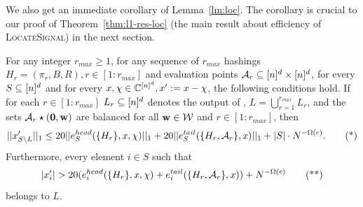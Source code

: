 We also get an immediate corollary of Lemma~\ref{lm:loc}. The corollary is crucial to our proof of Theorem~\ref{thm:l1-res-loc} (the main result about efficiency of \textsc{LocateSignal}) in the next section.
\begin{corollary}\label{cor:loc}
For any integer $r_{max}\geq 1$,  for any sequence of $r_{max}$ hashings $H_r=(\pi_r, B, R), r\in [1:r_{max}]$ and evaluation points ${\mathcal{A}}_r\subseteq {[n]^d}\times {[n]^d}$,  for every $S\subseteq {[n]^d}$ and for every $x, \chi\in \mathbb{C}^{{[n]^d}}, x':=x-\chi$, the following conditions hold.
If for each $r\in [1:r_{max}]$ $L_r\subseteq {[n]^d}$ denotes the output of , $L=\bigcup_{r=1}^{r_{max}} L_r$, and the sets ${\mathcal{A}}_r\star(\mathbf{0}, \mathbf{w})$ are balanced for all $\mathbf{w}\in \mathcal{W}$ and $r\in [1:r_{max}]$, then
\begin{equation}
||x'_{S\setminus L}||_1\leq 20 ||e^{head}_S(\{H_r\}, x, \chi)||_1+20 ||e^{tail}_S(\{H_r, {\mathcal{A}}_r\}, x)||_1+|S|\cdot N^{-\Omega(c)}.\tag{*}
\end{equation}
Furthermore, every element $i\in S$ such that 
\begin{equation}
|x'_i|>20 (e^{head}_i(\{H_r\}, x, \chi)+e^{tail}_i(\{H_r, \A_r\}, x))+N^{-\Omega(c)}\tag{**}
\end{equation}
belongs to $L$.
\end{corollary}
